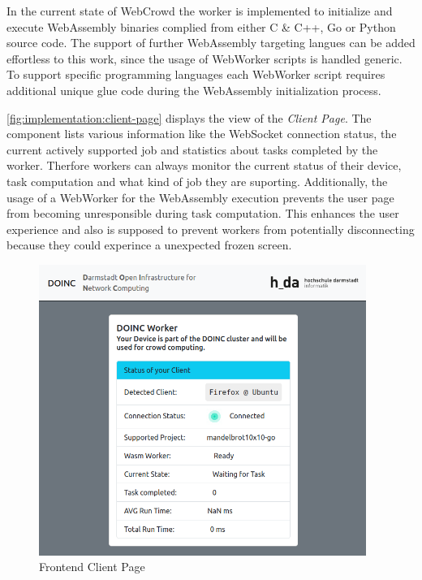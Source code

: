 In the current state of WebCrowd the worker is implemented to initialize and execute WebAssembly binaries complied from either C \& C++, Go or Python source code. The support of further WebAssembly targeting langues can be added effortless to this work, since the usage of WebWorker scripts is handled generic. To support specific programming languages each WebWorker script requires additional unique glue code during the WebAssembly initialization process.

\autoref{fig:implementation:client-page} displays the view of the \emph{Client Page}. The component lists various information like the WebSocket connection status, the current actively supported job and statistics about tasks completed by the worker. Therfore workers can always monitor the current status of their device, task computation and what kind of job they are suporting. Additionally, the usage of a WebWorker for the WebAssembly execution prevents the user page from becoming unresponsible during task computation. This enhances the user experience and also is supposed to prevent workers from potentially disconnecting because they could experince a unexpected frozen screen. 
\begin{figure}[htbp]
    \centering
    \includegraphics[width=0.95\textwidth]{gfx/figures/client-page.png}
    \caption{Frontend Client Page}
    \label{fig:implementation:client-page}
\end{figure}

